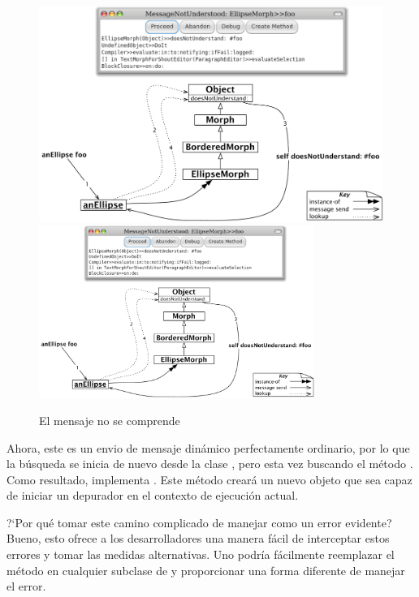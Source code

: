 \documentclass[a4paper,10pt,twoside]{book}
\begin{document}
\begin{figure}[htb]
\begin{center}
\ifluluelse
	{\includegraphics[width=\textwidth]{fooNotFound}}
	{\includegraphics[width=0.8\textwidth]{fooNotFound}}
\caption{El mensaje  no se comprende}
\end{center}
\end{figure}

Ahora, este es un envio de mensaje din\'amico perfectamente ordinario, por lo que la b\'usqueda se inicia de nuevo desde la clase , pero esta vez buscando el m\'etodo .
Como resultado,  implementa .
Este m\'etodo crear\'a un nuevo objeto  que sea capaz de iniciar un depurador en el contexto de ejecuci\'on actual.

?`Por qu\'e tomar este camino complicado de manejar como un error evidente?
Bueno, esto ofrece a los desarrolladores una manera f\'acil de interceptar estos errores y tomar las medidas alternativas.
Uno podr\'ia f\'acilmente reemplazar el m\'etodo  en cualquier subclase de  y proporcionar una forma diferente de manejar el error.
\end{document}
